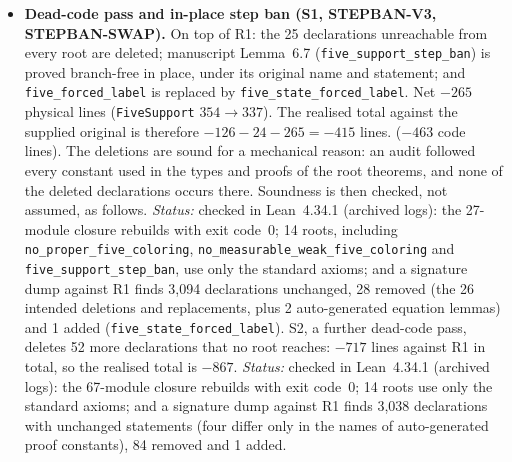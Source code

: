 \documentclass[11pt]{article}
\theoremstyle{definition}
\theoremstyle{remark}
\begin{document}
\begin{itemize}
\item \textbf{Dead-code pass and in-place step ban (S1, STEPBAN-V3, STEPBAN-SWAP).}
On top of R1: the 25 declarations unreachable from every root are deleted; manuscript Lemma~6.7 (\texttt{five\_\allowbreak{}support\_\allowbreak{}step\_\allowbreak{}ban}) is proved branch-free in place, under its original name and statement; and \texttt{five\_\allowbreak{}forced\_\allowbreak{}label} is replaced by \texttt{five\_\allowbreak{}state\_\allowbreak{}forced\_\allowbreak{}label}. Net $-265$ physical lines (\texttt{FiveSupport} $354\to337$). The realised total against the supplied original is therefore $-126-24-265=-415$ lines. ($-463$ code lines). The deletions are sound for a mechanical reason: an audit followed every constant used in the types and proofs of the root theorems, and none of the deleted declarations occurs there. Soundness is then checked, not assumed, as follows.
\emph{Status:} checked in Lean~4.34.1 (archived logs): the 27-module closure rebuilds with exit code~0; 14 roots, including \texttt{no\_\allowbreak{}proper\_\allowbreak{}five\_\allowbreak{}coloring}, \texttt{no\_\allowbreak{}measurable\_\allowbreak{}weak\_\allowbreak{}five\_\allowbreak{}coloring} and \texttt{five\_\allowbreak{}support\_\allowbreak{}step\_\allowbreak{}ban}, use only the standard axioms; and a signature dump against R1 finds 3,094 declarations unchanged, 28 removed (the 26 intended deletions and replacements, plus 2 auto-generated equation lemmas) and 1 added (\texttt{five\_\allowbreak{}state\_\allowbreak{}forced\_\allowbreak{}label}).
S2, a further dead-code pass, deletes 52 more declarations that no root reaches: $-717$ lines against R1 in total, so the realised total is $-867$. \emph{Status:} checked in Lean~4.34.1 (archived logs): the 67-module closure rebuilds with exit code~0; 14 roots use only the standard axioms; and a signature dump against R1 finds 3,038 declarations with unchanged statements (four differ only in the names of auto-generated proof constants), 84 removed and 1 added.


\end{itemize}
\end{document}
